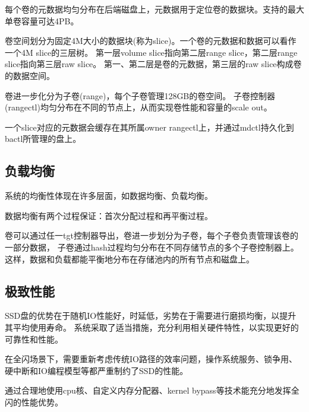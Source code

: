 每个卷的元数据均匀分布在后端磁盘上，元数据用于定位卷的数据块。支持的最大单卷容量可达4PB。

卷空间划分为固定4M大小的数据块(称为slice)。一个卷的元数据和数据可以看作一个4M slice的三层树。
第一层volume slice指向第二层range slice，第二层range slice指向第三层raw slice。
第一、第二层是卷的元数据，第三层的raw slice构成卷的数据空间。

卷进一步化分为子卷(range)，每个子卷管理128GB的卷空间。
子卷控制器(rangectl)均匀分布在不同的节点上，从而实现卷性能和容量的scale out。

一个slice对应的元数据会缓存在其所属owner rangectl上，并通过mdctl持久化到bactl所管理的盘上。

\subsection{负载均衡}

系统的均衡性体现在许多层面，如数据均衡、负载均衡。

数据均衡有两个过程保证：首次分配过程和再平衡过程。

卷可以通过任一tgt控制器导出，卷进一步划分为子卷，每个子卷负责管理该卷的一部分数据，
子卷通过hash过程均匀分布在不同存储节点的多个子卷控制器上。
这样，数据和负载都能平衡地分布在存储池内的所有节点和磁盘上。



\subsection{极致性能}

SSD盘的优势在于随机IO性能好，时延低，劣势在于需要进行磨损均衡，以提升其平均使用寿命。
系统采取了适当措施，充分利用相关硬件特性，以实现更好的可靠性和性能。

在全闪场景下，需要重新考虑传统IO路径的效率问题，操作系统服务、锁争用、硬中断和IO编程模型等都严重制约了SSD的性能。

通过合理地使用cpu核、自定义内存分配器、kernel bypass等技术能充分地发挥全闪的性能优势。


